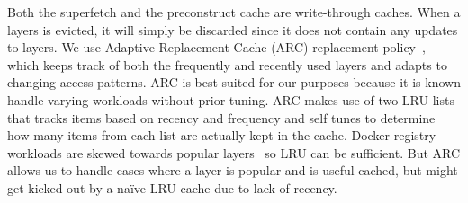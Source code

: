 Both the superfetch and the preconstruct cache are write-through caches.
When a layers is evicted, it will simply be discarded since it does not contain any
updates to layers.
%
We use Adaptive Replacement Cache (ARC) replacement policy~\cite{megiddo2003arc}, which keeps track of both the frequently and recently used layers and adapts to changing access patterns. 
ARC is best suited for our purposes because it is known handle varying workloads
without prior tuning. %
ARC makes use of two LRU lists that tracks items based on recency and frequency
and self tunes to determine how many items from each list are actually kept in 
the cache. Docker registry workloads are skewed towards popular 
layers~\cite{dockerworkload} so LRU can be sufficient. But ARC allows us to handle
cases where a layer is popular and is useful cached, but might get kicked out by
a na{\"i}ve LRU cache due to lack of recency.
 
%


